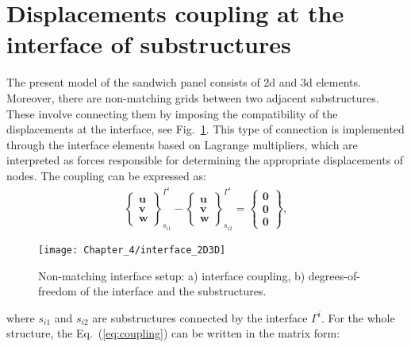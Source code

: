 \section{Displacements coupling at the interface of substructures}
\label{sec:interface}


The present model of the sandwich panel consists of \ac{2d} and \ac{3d} elements. 
Moreover, there are non-matching grids between two adjacent substructures. 
These involve connecting them by imposing the compatibility of the displacements at the interface, see Fig.~\ref{fig:interface}.
This type of connection is implemented through the interface elements based on Lagrange multipliers, which are interpreted as forces responsible for determining the appropriate displacements of nodes.
The coupling can be expressed as:
\begin{eqnarray}
	\left\{\begin{array}{c}
		\textbf{u}\\
		\textbf{v}\\
		\textbf{w}
	\end{array}\right\}_{s_{i1}}^{\Gamma^i}-
	\left\{\begin{array}{c}
		\textbf{u}\\
		\textbf{v}\\
		\textbf{w}
	\end{array}\right\}_{s_{i2}}^{\Gamma^i}=
	\left\{\begin{array}{c}
		\textbf{0}\\
		\textbf{0}\\
		\textbf{0}
	\end{array}\right\},
	\label{eq:coupling}
\end{eqnarray}
%
\begin{figure}
	\begin{center}
		\texttt{[image: Chapter\_4/interface\_2D3D]}
	\end{center}
	\caption{Non-matching interface setup: a) interface coupling, b) degrees-of-freedom of the interface and the substructures.}
	\label{fig:interface}
\end{figure}
where \(s_{i1}\) and \(s_{i2}\) are substructures connected by the interface \(\Gamma^i\). For the whole structure, the Eq.~(\ref{eq:coupling}) can be written in the matrix form:
